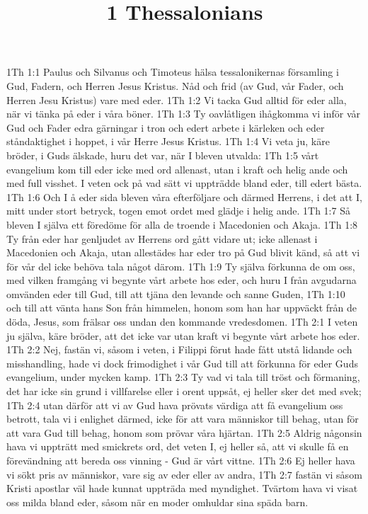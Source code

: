 

\title{1 Thessalonians}

1Th 1:1  Paulus och Silvanus och Timoteus hälsa tessalonikernas församling i Gud, Fadern, och Herren Jesus Kristus. Nåd och frid (av Gud, vår Fader, och Herren Jesu Kristus) vare med eder.
1Th 1:2  Vi tacka Gud alltid för eder alla, när vi tänka på eder i våra böner.
1Th 1:3  Ty oavlåtligen ihågkomma vi inför vår Gud och Fader edra gärningar i tron och edert arbete i kärleken och eder ståndaktighet i hoppet, i vår Herre Jesus Kristus.
1Th 1:4  Vi veta ju, käre bröder, i Guds älskade, huru det var, när I bleven utvalda:
1Th 1:5  vårt evangelium kom till eder icke med ord allenast, utan i kraft och helig ande och med full visshet. I veten ock på vad sätt vi uppträdde bland eder, till edert bästa.
1Th 1:6  Och I å eder sida bleven våra efterföljare och därmed Herrens, i det att I, mitt under stort betryck, togen emot ordet med glädje i helig ande.
1Th 1:7  Så bleven I själva ett föredöme för alla de troende i Macedonien och Akaja.
1Th 1:8  Ty från eder har genljudet av Herrens ord gått vidare ut; icke allenast i Macedonien och Akaja, utan allestädes har eder tro på Gud blivit känd, så att vi för vår del icke behöva tala något därom.
1Th 1:9  Ty själva förkunna de om oss, med vilken framgång vi begynte vårt arbete hos eder, och huru I från avgudarna omvänden eder till Gud, till att tjäna den levande och sanne Guden,
1Th 1:10  och till att vänta hans Son från himmelen, honom som han har uppväckt från de döda, Jesus, som frälsar oss undan den kommande vredesdomen.
1Th 2:1  I veten ju själva, käre bröder, att det icke var utan kraft vi begynte vårt arbete hos eder.
1Th 2:2  Nej, fastän vi, såsom i veten, i Filippi förut hade fått utstå lidande och misshandling, hade vi dock frimodighet i vår Gud till att förkunna för eder Guds evangelium, under mycken kamp.
1Th 2:3  Ty vad vi tala till tröst och förmaning, det har icke sin grund i villfarelse eller i orent uppsåt, ej heller sker det med svek;
1Th 2:4  utan därför att vi av Gud hava prövats värdiga att få evangelium oss betrott, tala vi i enlighet därmed, icke för att vara människor till behag, utan för att vara Gud till behag, honom som prövar våra hjärtan.
1Th 2:5  Aldrig någonsin hava vi uppträtt med smickrets ord, det veten I, ej heller så, att vi skulle få en förevändning att bereda oss vinning - Gud är vårt vittne.
1Th 2:6  Ej heller hava vi sökt pris av människor, vare sig av eder eller av andra,
1Th 2:7  fastän vi såsom Kristi apostlar väl hade kunnat uppträda med myndighet. Tvärtom hava vi visat oss milda bland eder, såsom när en moder omhuldar sina späda barn.
